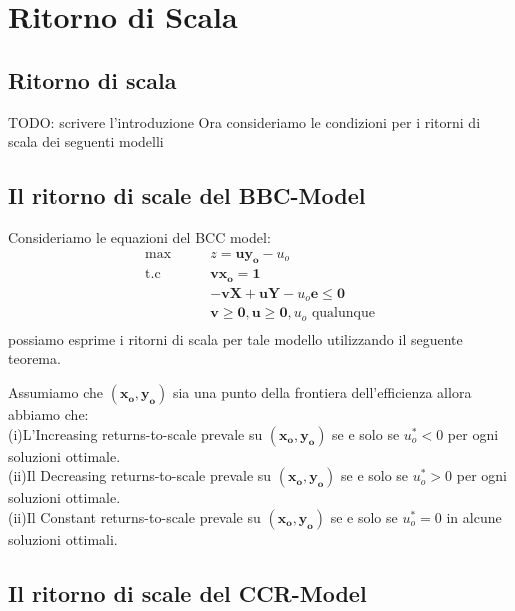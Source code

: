 \chapter{Ritorno di Scala} \label{CAP:tre}
\section{Ritorno di scala}
\bigskip

TODO: scrivere l'introduzione
Ora consideriamo le condizioni per i ritorni di scala dei seguenti modelli

\section{Il ritorno di scale del BBC-Model}

Consideriamo le equazioni del BCC model:
\begin{equation}
\begin{split}
\max \qquad & z = \boldsymbol{uy_o} - u_o \\
\text{t.c} \qquad & \boldsymbol{vx_o = 1} \\
& \boldsymbol{-vX + uY -} u_o\boldsymbol{e \leq 0} \\
& \boldsymbol{v \geq 0, u \geq 0,} u_o \text{ qualunque} \\ 
\end{split}
\end{equation}
possiamo esprime i ritorni di scala per tale modello utilizzando il seguente teorema.

\begin{teor} Assumiamo che $(\boldsymbol{x_o, y_o})$ sia una punto della frontiera dell'efficienza allora abbiamo che: \\
(i)L'Increasing returns-to-scale prevale su $(\boldsymbol{x_o, y_o})$ se e solo se $u^*_o < 0$ per ogni soluzioni ottimale. \\
(ii)Il Decreasing returns-to-scale prevale su $(\boldsymbol{x_o, y_o})$ se e solo se $u^*_o > 0$ per ogni soluzioni ottimale.\\
(ii)Il Constant returns-to-scale prevale su $(\boldsymbol{x_o, y_o})$ se e solo se $u^*_o = 0$ in alcune soluzioni ottimali.\\
\end{teor}

\section{Il ritorno di scale del CCR-Model}


